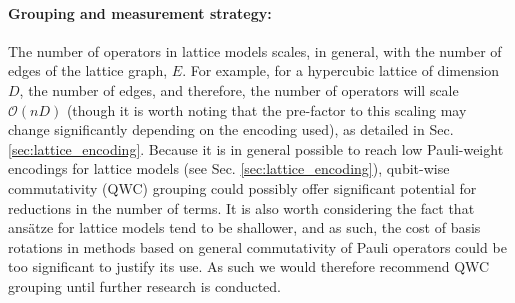 \paragraph{Grouping and measurement strategy: } 
The number of operators in lattice models scales, in general, with the number of edges of the lattice graph, $E$. For example, for a hypercubic lattice of dimension $D$, the number of edges, and therefore, the number of operators will scale $\mathcal{O}(nD)$ (though it is worth noting that the pre-factor to this scaling may change significantly depending on the encoding used), as detailed in Sec. \ref{sec:lattice_encoding}. Because it is in general possible to reach low Pauli-weight encodings for lattice models (see Sec. \ref{sec:lattice_encoding}), qubit-wise commutativity (QWC) grouping \cite{mccleanTheoryVariationalHybrid2015, Kandala2017, Hempel2018, Rubin2018, Kokail2019, Izmaylov2019, Nam2020, Verteletskyi2020, Hamamura2020, Gokhale2019_long} could possibly offer significant potential for reductions in the number of terms. It is also worth considering the fact that ans\"atze for lattice models tend to be shallower, and as such, the cost of basis rotations in methods based on general commutativity of Pauli operators could be too significant to justify its use. As such we would therefore recommend QWC grouping until further research is conducted.

